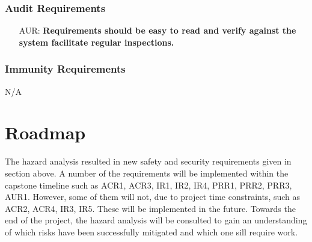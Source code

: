 \documentclass{article}
\newcounter{aurreqnum} %
\begin{document}
\subsubsection{Audit Requirements}
\begin{itemize}
    \item[AUR\refstepcounter{aurreqnum}\theaurreqnum \label{R_Inputs}:] \textbf{Requirements should be easy to read and verify against the system facilitate regular inspections.}
\end{itemize}

\subsubsection{Immunity Requirements}
N/A

\section{Roadmap}

The hazard analysis resulted in new safety and security requirements given in section above. A number of the requirements will be implemented within the capstone timeline such as ACR1, ACR3, IR1, IR2, IR4, PRR1, PRR2, PRR3, AUR1. However, some of them will not, due to project time constraints, such as ACR2, ACR4, IR3, IR5. These will be implemented in the future. Towards the end of the project, the hazard analysis will be consulted to gain an understanding of which risks have been successfully mitigated and which one sill require work.
\end{document}
